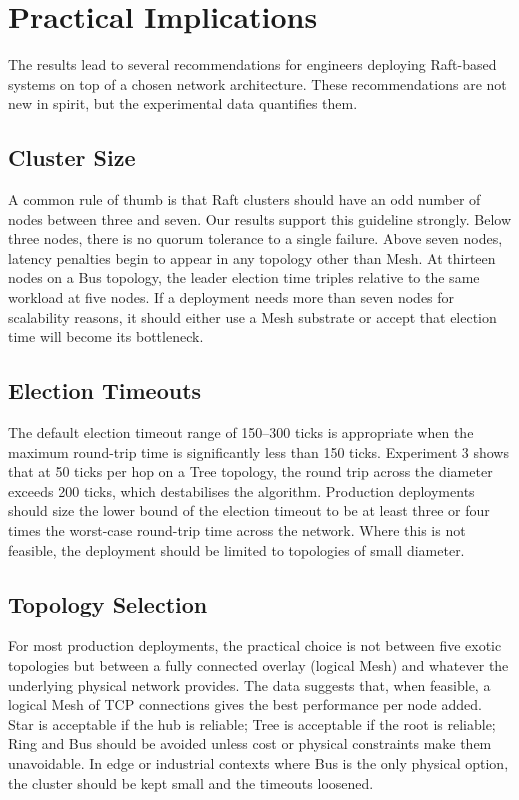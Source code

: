 \section{Practical Implications}

The results lead to several recommendations for engineers deploying Raft-based systems on top of a chosen network architecture. These recommendations are not new in spirit, but the experimental data quantifies them.

\subsection{Cluster Size}

A common rule of thumb is that Raft clusters should have an odd number of nodes between three and seven. Our results support this guideline strongly. Below three nodes, there is no quorum tolerance to a single failure. Above seven nodes, latency penalties begin to appear in any topology other than Mesh. At thirteen nodes on a Bus topology, the leader election time triples relative to the same workload at five nodes. If a deployment needs more than seven nodes for scalability reasons, it should either use a Mesh substrate or accept that election time will become its bottleneck.

\subsection{Election Timeouts}

The default election timeout range of 150--300 ticks is appropriate when the maximum round-trip time is significantly less than 150 ticks. Experiment 3 shows that at 50 ticks per hop on a Tree topology, the round trip across the diameter exceeds 200 ticks, which destabilises the algorithm. Production deployments should size the lower bound of the election timeout to be at least three or four times the worst-case round-trip time across the network. Where this is not feasible, the deployment should be limited to topologies of small diameter.

\subsection{Topology Selection}

For most production deployments, the practical choice is not between five exotic topologies but between a fully connected overlay (logical Mesh) and whatever the underlying physical network provides. The data suggests that, when feasible, a logical Mesh of TCP connections gives the best performance per node added. Star is acceptable if the hub is reliable; Tree is acceptable if the root is reliable; Ring and Bus should be avoided unless cost or physical constraints make them unavoidable. In edge or industrial contexts where Bus is the only physical option, the cluster should be kept small and the timeouts loosened.

